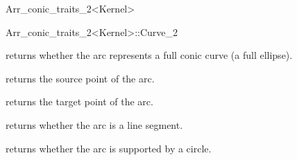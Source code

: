 \begin{ccRefClass}{Arr_conic_traits_2<Kernel>}
\begin{ccClass}{Arr_conic_traits_2<Kernel>::Curve_2}
\ccOperations

  {returns whether the arc represents a full conic curve (a full ellipse).}

  {returns the source point of the arc.}

  {returns the target point of the arc.}


  {returns whether the arc is a line segment.}

  {returns whether the arc is supported by a circle.} 


\end{ccClass}

\end{ccRefClass} %

\ccRefPageEnd

